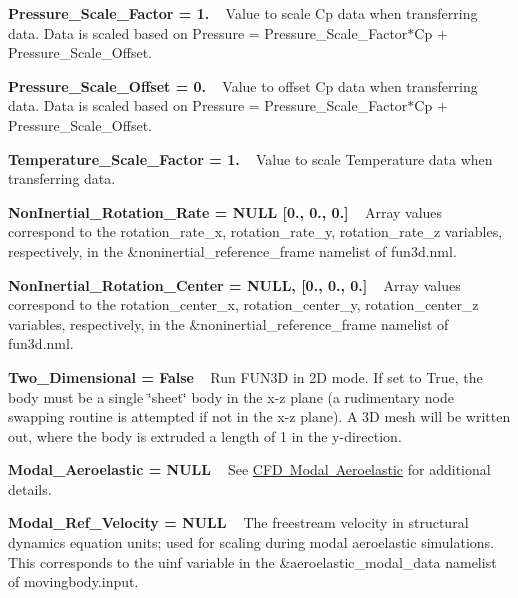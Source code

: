 \begin{DoxyItemize}
\item {\bfseries{Pressure\+\_\+\+Scale\+\_\+\+Factor = 1.}} ~\newline
 Value to scale Cp data when transferring data. Data is scaled based on Pressure = Pressure\+\_\+\+Scale\+\_\+\+Factor$\ast$\+Cp + Pressure\+\_\+\+Scale\+\_\+\+Offset.
\item {\bfseries{Pressure\+\_\+\+Scale\+\_\+\+Offset = 0.}} ~\newline
 Value to offset Cp data when transferring data. Data is scaled based on Pressure = Pressure\+\_\+\+Scale\+\_\+\+Factor$\ast$\+Cp + Pressure\+\_\+\+Scale\+\_\+\+Offset.
\item {\bfseries{Temperature\+\_\+\+Scale\+\_\+\+Factor = 1.}} ~\newline
 Value to scale Temperature data when transferring data.
\item {\bfseries{Non\+Inertial\+\_\+\+Rotation\+\_\+\+Rate = NULL \mbox{[}0., 0., 0.\mbox{]}}} ~\newline
 Array values correspond to the rotation\+\_\+rate\+\_\+x, rotation\+\_\+rate\+\_\+y, rotation\+\_\+rate\+\_\+z variables, respectively, in the \&noninertial\+\_\+reference\+\_\+frame namelist of fun3d.\+nml.
\item {\bfseries{Non\+Inertial\+\_\+\+Rotation\+\_\+\+Center = NULL, \mbox{[}0., 0., 0.\mbox{]}}} ~\newline
 Array values correspond to the rotation\+\_\+center\+\_\+x, rotation\+\_\+center\+\_\+y, rotation\+\_\+center\+\_\+z variables, respectively, in the \&noninertial\+\_\+reference\+\_\+frame namelist of fun3d.\+nml.
\item {\bfseries{Two\+\_\+\+Dimensional = False}} ~\newline
 Run FUN3D in 2D mode. If set to True, the body must be a single \char`\"{}sheet\char`\"{} body in the x-\/z plane (a rudimentary node swapping routine is attempted if not in the x-\/z plane). A 3D mesh will be written out, where the body is extruded a length of 1 in the y-\/direction.
\item {\bfseries{Modal\+\_\+\+Aeroelastic = NULL }} ~\newline
 See \mbox{\hyperlink{cfdModalAeroelastic}{CFD Modal Aeroelastic}} for additional details.
\item {\bfseries{Modal\+\_\+\+Ref\+\_\+\+Velocity = NULL }} ~\newline
 The freestream velocity in structural dynamics equation units; used for scaling during modal aeroelastic simulations. This corresponds to the uinf variable in the \&aeroelastic\+\_\+modal\+\_\+data namelist of movingbody.\+input.

\end{DoxyItemize}
